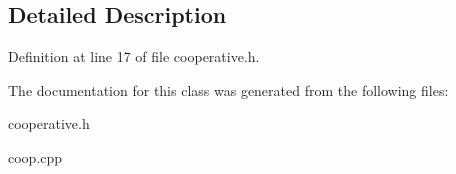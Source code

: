 \subsection{Detailed Description}




Definition at line 17 of file cooperative.h.

The documentation for this class was generated from the following files:\begin{CompactItemize}
\item 
cooperative.h\item 
coop.cpp\end{CompactItemize}
